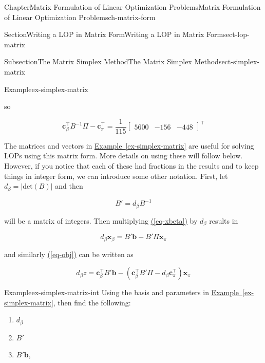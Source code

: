 \documentclass[oneside,10pt,]{book}
\newcommand{\xreffont}{\relax}
\numberwithin{equation}{section}
\newcommand{\amp}{&}
\begin{document}
\begin{chapterptx}{Chapter}{Matrix Formulation of Linear Optimization Problems}{}{Matrix Formulation of Linear Optimization Problems}{}{}{ch-matrix-form}
\begin{sectionptx}{Section}{Writing a LOP in Matrix Form}{}{Writing a LOP in Matrix Form}{}{}{sect-lop-matrix}
\begin{subsectionptx}{Subsection}{The Matrix Simplex Method}{}{The Matrix Simplex Method}{}{}{sect-simplex-matrix}
\begin{example}{Example}{}{ex-simplex-matrix}
\begin{enumerate}
%
\par
so%
\par
%
\begin{equation*}
\boldsymbol{c}_{\beta}^{\intercal}B^{-1}\Pi -\boldsymbol{c}_{\pi}^{\intercal} = \frac{1}{115}\begin{bmatrix} 5600 \amp -156 \amp  -448 \end{bmatrix}^{\intercal}
\end{equation*}
%
\end{enumerate}
%
\end{example}
The matrices and vectors in \hyperref[ex-simplex-matrix]{Example~{\xreffont\ref{ex-simplex-matrix}}} are useful for solving LOPs using this matrix form. More details on using these will follow below. However, if you notice that each of these had fractions in the results and to keep things in integer form, we can introduce some other notation. First, let \(d_{\beta} = |\text{det}(B)|\) and then%
\par
%
\begin{equation*}
B' = d_{\beta}B^{-1}
\end{equation*}
%
\par
will be a matrix of integers. Then multiplying \hyperref[eq-xbeta]{({\xreffont\ref{eq-xbeta}})} by \(d_{\beta}\) results in%
\par
%
\begin{equation}
d_{\beta} \boldsymbol{x}_{\beta} = B' \boldsymbol{b} - B'\Pi\boldsymbol{x}_{\pi}\label{sect-simplex-matrix-35-1}
\end{equation}
%
\par
and similarly \hyperref[eq-obj]{({\xreffont\ref{eq-obj}})} can be written as%
\par
%
\begin{equation}
d_{\beta} z = \boldsymbol{c}_{\beta}^{\intercal} B' \boldsymbol{b} - (\boldsymbol{c}_{\beta}^{\intercal} B' \Pi - d_{\beta}\boldsymbol{c}_{\pi}^{\intercal}) \boldsymbol{x}_{\pi}\label{eq-obj2}
\end{equation}
%
\begin{example}{Example}{}{ex-simplex-matrix-int}%
Using the basis and parameters in \hyperref[ex-simplex-matrix]{Example~{\xreffont\ref{ex-simplex-matrix}}}, then find the following:%
\par
%
\begin{enumerate}
\item{}\(\displaystyle d_{\beta}\)%
\item{}\(\displaystyle B'\)%
\item{}\(B'\boldsymbol{b}\),%

\end{enumerate}
\end{example}
\end{subsectionptx}
\end{sectionptx}
\end{chapterptx}
\end{document}
